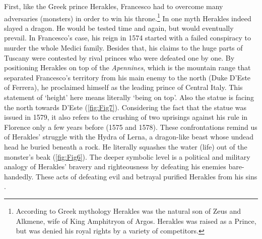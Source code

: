 First, like the Greek prince Herakles, Francesco had to overcome many adversaries (monsters) in order to win his throne.\footnote{According to Greek mythology Herakles was the natural son of Zeus and Alkmene, wife of King Amphitryon of Argos. Herakles was raised as a Prince, but was denied his royal rights by a variety of competitors.}  In one myth Herakles indeed slayed a dragon. He would be tested time and again, but would eventually prevail. In Francesco’s case, his reign in 1574 started with a failed conspiracy to murder the whole Medici family. Besides that,  his claims to the huge parts of Tuscany were contested by rival princes who were defeated one by one. By positioning Herakles on top of the \textit{Apennines}, which is the mountain range that separated Francesco’s territory from his main enemy to the north (Duke D’Este of Ferrera), he proclaimed himself as the leading prince of Central Italy. This statement of ‘height’ here means literally ‘being on top’. Also the statue is facing the north towards D’Este (\cref{fig:Fig7}). Considering the fact that the statue was issued in 1579, it also refers to the crushing of two uprisings against his rule in Florence only a few years before (1575 and 1578). These confrontations remind us of Herakles’ struggle with the Hydra of Lerna, a dragon-like beast whose undead head he buried beneath a rock. He literally squashes the water (life) out of the monster’s beak (\cref{fig:Fig6}). The deeper symbolic level is a political and military analogy of Herakles’ bravery and righteousness by defeating his enemies bare-handedly. These acts of defeating evil and betrayal purified Herakles from his sins \parencites[207-209;211]{Moormann2007}.

